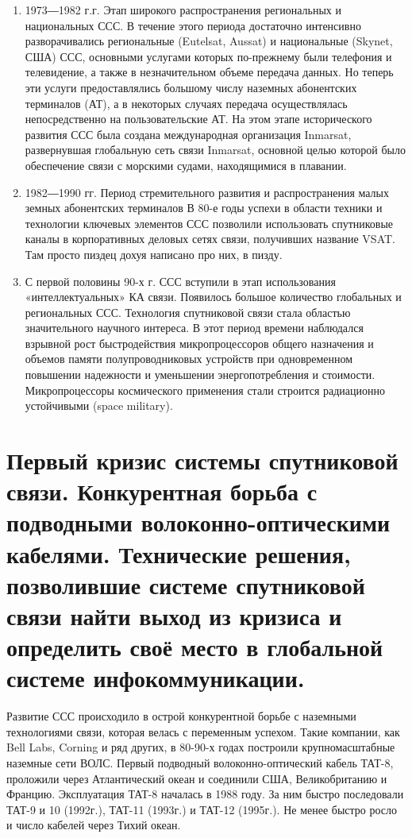 \documentclass[14pt,a4paper,oneside]{extarticle}
\begin{document}
\begin{enumerate}
    \item 1973―1982 г.г. Этап широкого распространения региональных и  национальных ССС. В течение этого периода достаточно интенсивно разворачивались региональные (Eutelsat, Aussat) и национальные (Skynet, США) ССС,  основными услугами которых по-прежнему были телефония и телевидение, а также в незначительном объеме передача данных. Но теперь эти услуги предоставлялись большому числу наземных абонентских терминалов (АТ), а в некоторых случаях передача осуществлялась непосредственно на  пользовательские АТ. На этом этапе исторического развития ССС была создана  международная организация Inmarsat, развернувшая глобальную сеть связи Inmarsat, основной целью которой было обеспечение связи с морскими судами, находящимися в плавании.
    \item 1982―1990 гг. Период стремительного развития и распространения малых земных абонентских терминалов В 80-е годы успехи в области техники и технологии ключевых элементов ССС позволили использовать спутниковые каналы в корпоративных деловых сетях связи, получивших название VSAT. Там просто пиздец дохуя написано про них, в пизду.
    \item С первой половины 90-х г. ССС вступили в этап использования «интеллектуальных» КА связи. Появилось большое количество глобальных и региональных ССС. Технология спутниковой связи стала областью значительного научного интереса. В этот период времени наблюдался взрывной рост быстродействия микропроцессоров общего назначения и объемов памяти  полупроводниковых устройств при одновременном повышении надежности и уменьшении энергопотребления и стоимости. Микропроцессоры космического применения стали строится радиационно устойчивыми (space military).
\end{enumerate}

\section{Первый кризис системы спутниковой связи. Конкурентная борьба с подводными волоконно-оптическими кабелями. Технические решения, позволившие системе спутниковой связи найти выход из кризиса и определить своё место в глобальной системе инфокоммуникации.}

Развитие ССС происходило в острой конкурентной борьбе с наземными технологиями связи, которая велась с переменным успехом. Такие компании, как Bell Labs, Corning и ряд других, в 80-90-х годах построили крупномасштабные наземные сети ВОЛС.
Первый подводный волоконно-оптический кабель ТАТ-8, проложили через Атлантический океан и соединили США, Великобританию и Францию. Эксплуатация ТАТ-8 началась в 1988 году. За ним быстро последовали ТАТ-9 и 10 (1992г.), ТАТ-11 (1993г.) и ТАТ-12 (1995г.). Не менее быстро росло и число кабелей через Тихий океан.
\end{document}
